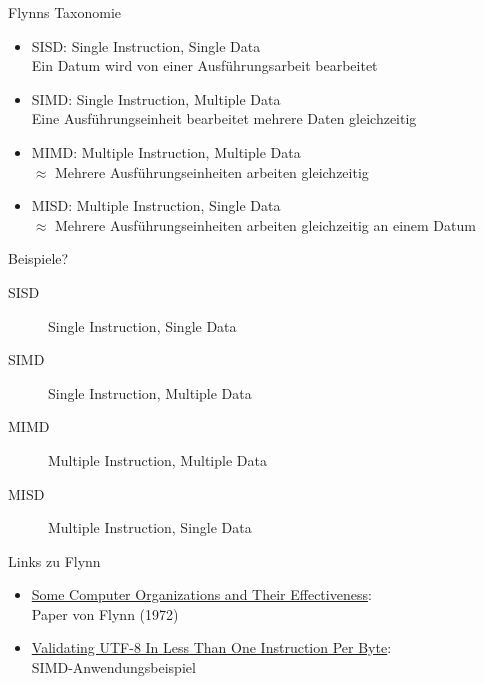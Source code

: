 \documentclass{beamer}
\begin{document}
\begin{frame}{Flynns Taxonomie}
	\begin{itemize}
		\item SISD: Single Instruction, Single Data\\
			{\footnotesize Ein Datum wird von einer Ausführungsarbeit bearbeitet}
		\item SIMD: Single Instruction, Multiple Data\\
			{\footnotesize Eine Ausführungseinheit bearbeitet mehrere Daten gleichzeitig}
		\item MIMD: Multiple Instruction, Multiple Data\\
			{\footnotesize $\approx$ Mehrere Ausführungseinheiten arbeiten gleichzeitig}
		\item MISD: Multiple Instruction, Single Data\\
			{\footnotesize $\approx$ Mehrere Ausführungseinheiten arbeiten gleichzeitig an einem Datum}
	\end{itemize}

	\pause
	Beispiele?
\end{frame}

\begin{frame}{SISD}
	\begin{figure}
		
		\caption*{Single Instruction, Single Data}
	\end{figure}
\end{frame}

\begin{frame}{SIMD}
	\begin{figure}
		
		\caption*{Single Instruction, Multiple Data}
	\end{figure}
\end{frame}

\begin{frame}{MIMD}
	\begin{figure}
		
		\caption*{Multiple Instruction, Multiple Data}
	\end{figure}
\end{frame}

\begin{frame}{MISD}
	\begin{figure}
		
		\caption*{Multiple Instruction, Single Data}
	\end{figure}
\end{frame}

\begin{frame}{Links zu Flynn}
	\begin{itemize}
		\item \href{https://www.cs.utah.edu/~hari/teaching/paralg/Flynn72.pdf}{Some Computer Organizations and Their Effectiveness}: \\
			  Paper von Flynn (1972)
		\item \href{https://arxiv.org/abs/2010.03090}{Validating UTF-8 In Less Than One Instruction Per Byte}: \\
			  SIMD-Anwendungsbeispiel
	\end{itemize}
\end{frame}
\end{document}
